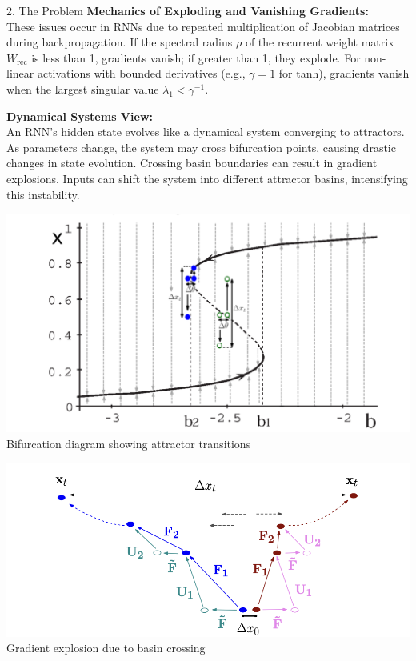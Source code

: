 \documentclass[final]{beamer}
\begin{document}
\begin{frame}[t]
\begin{columns}[t,totalwidth=\textwidth]
\begin{column}{0.33\textwidth}
\begin{block}{2. The Problem}
    \textbf{Mechanics of Exploding and Vanishing Gradients:} \\
    These issues occur in RNNs due to repeated multiplication of Jacobian matrices during backpropagation. If the spectral radius $\rho$ of the recurrent weight matrix $W_{\text{rec}}$ is less than 1, gradients vanish; if greater than 1, they explode. For non-linear activations with bounded derivatives (e.g., $\gamma=1$ for tanh), gradients vanish when the largest singular value $\lambda_1 < \gamma^{-1}$.

    \vspace{0.5em}
    \textbf{Dynamical Systems View:} \\
    An RNN’s hidden state evolves like a dynamical system converging to attractors. As parameters change, the system may cross bifurcation points, causing drastic changes in state evolution. Crossing basin boundaries can result in gradient explosions. Inputs can shift the system into different attractor basins, intensifying this instability.

    \begin{center}
        \includegraphics[width=0.9\linewidth]{figures/bifurcation.png} \\
        \small Bifurcation diagram showing attractor transitions
    \end{center}
    
    \begin{center}
        \includegraphics[width=0.9\linewidth]{figures/function_and_input.png} \\
        \small Gradient explosion due to basin crossing
    \end{center}


\end{block}
\end{column}
\end{columns}
\end{frame}
\end{document}
